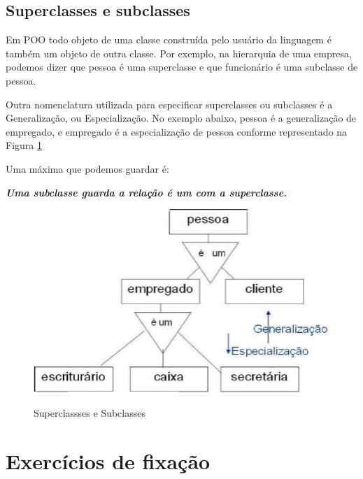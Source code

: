 \subsection{Superclasses e subclasses}

Em POO todo objeto de uma classe construída pelo usuário da linguagem é também um objeto de outra classe. Por exemplo, na hierarquia de uma empresa, podemos dizer que pessoa é uma superclasse e que funcionário é uma subclasse de pessoa.

Outra nomenclatura utilizada para especificar superclasses ou subclasses é a Generalização, ou Especialização. No exemplo abaixo, pessoa é a generalização de empregado, e empregado é a especialização de pessoa conforme representado na Figura \ref{fig:sub-e-sup-classes}

Uma máxima que podemos guardar é: 

\begin{center}
\textbf{\textit{Uma subclasse guarda a relação é um com a superclasse.}}    
\end{center}

\begin{figure}[H]
  \centering
  \caption{Superclassses e Subclasses}
  \includegraphics[scale=0.5]{imagens/sub-e-sup-classes.png}
  \label{fig:sub-e-sup-classes}
\end{figure}

\section*{Exercícios de fixação}\label{exer:001}

